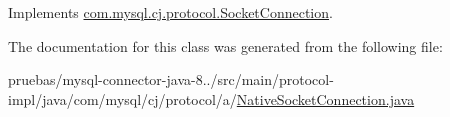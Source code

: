 Implements \mbox{\hyperlink{interfacecom_1_1mysql_1_1cj_1_1protocol_1_1_socket_connection_a15064c0de5e729be5f27a42aee58fdd5}{com.\+mysql.\+cj.\+protocol.\+Socket\+Connection}}.



The documentation for this class was generated from the following file\+:\begin{DoxyCompactItemize}
\item 
pruebas/mysql-\/connector-\/java-\/8../src/main/protocol-\/impl/java/com/mysql/cj/protocol/a/\mbox{\hyperlink{_native_socket_connection_8java}{Native\+Socket\+Connection.\+java}}\end{DoxyCompactItemize}
